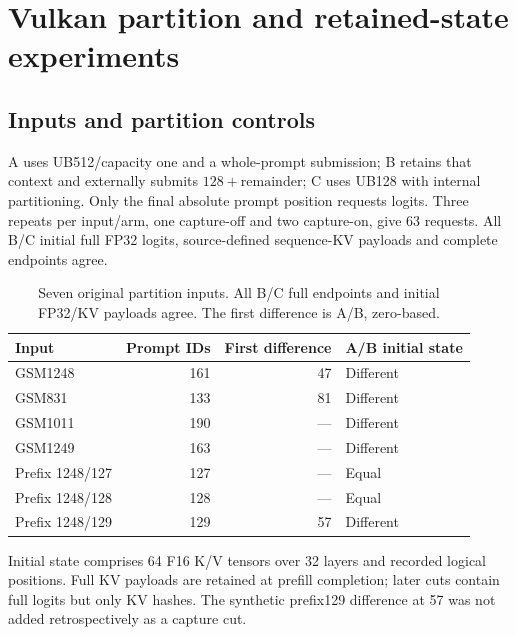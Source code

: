 \section{Vulkan partition and retained-state experiments}
\label{supp:b570}
\subsection{Inputs and partition controls}
A uses UB512/capacity one and a whole-prompt submission; B retains that context and externally submits $128+\mathrm{remainder}$; C uses UB128 with internal partitioning. Only the final absolute prompt position requests logits. Three repeats per input/arm, one capture-off and two capture-on, give 63 requests. All B/C initial full FP32 logits, source-defined sequence-KV payloads and complete endpoints agree.
\begin{table}[t]\centering\small
\setlength{\tabcolsep}{3.3pt}
\caption{Seven original partition inputs. All B/C full endpoints and initial FP32/KV payloads agree. The first difference is A/B, zero-based.}
\begin{tabular}{@{}lrrl@{}}\toprule
Input&Prompt IDs&First difference&A/B initial state\\\midrule
GSM1248&161&47&Different\\
GSM831&133&81&Different\\
GSM1011&190&---&Different\\
GSM1249&163&---&Different\\
Prefix 1248/127&127&---&Equal\\
Prefix 1248/128&128&---&Equal\\
Prefix 1248/129&129&57&Different\\\bottomrule
\end{tabular}
\end{table}
Initial state comprises 64 F16 K/V tensors over 32 layers and recorded logical positions. Full KV payloads are retained at prefill completion; later cuts contain full logits but only KV hashes. The synthetic prefix129 difference at 57 was not added retrospectively as a capture cut.


